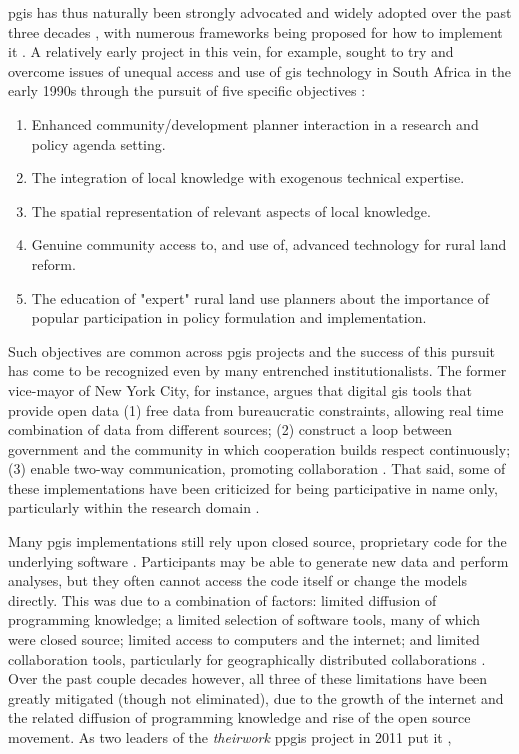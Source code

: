 \ac{pgis} has thus naturally been strongly advocated and widely adopted over the past three decades \cite{drummondFutureGISPlanning2008}, with numerous frameworks being proposed for how to implement it \cite{brommelstroetPlanningSupportSystems2010}. A relatively early project in this vein, for example, sought to try and overcome issues of unequal access and use of \ac{gis} technology in South Africa in the early 1990s through the pursuit of five specific objectives \cite{harrisPursuingSocialGoals1994}: 

\begin{enumerate}[itemsep=0pt,parsep=0pt]
	\item{Enhanced community/development planner interaction in a research and policy agenda setting.}
	\item{The integration of local knowledge with exogenous technical expertise.}
	\item{The spatial representation of relevant aspects of local knowledge.}
	\item{Genuine community access to, and use of, advanced technology for rural land reform.}
	\item{The education of "expert" rural land use planners about the importance of popular participation in policy formulation and implementation.}
\end{enumerate}

Such objectives are common across \ac{pgis} projects and the success of this pursuit has come to be recognized even by many entrenched institutionalists. The former vice-mayor of New York City, for instance, argues that digital \ac{gis} tools that provide open data (1) free data from bureaucratic constraints, allowing real time combination of data from different sources; (2) construct a loop between government and the community in which cooperation builds respect continuously; (3) enable two-way communication, promoting collaboration \cite{goldsmithResponsiveCityEngaging2014}. That said, some of these implementations have been criticized for being participative in name only, particularly within the research domain \cite{tebrommelstroetRelevanceResearchPlanning2009}.


Many \ac{pgis} implementations still rely upon closed source, proprietary code for the underlying software \cite{heikkilaGISDeadLong1998}. Participants may be able to generate new data and perform analyses, but they often cannot access the code itself or change the models directly. This was due to a combination of factors: limited diffusion of programming knowledge; a limited selection of software tools, many of which were closed source; limited access to computers and the internet; and limited collaboration tools, particularly for geographically distributed collaborations \cite{cramptonIntroductionCriticalCartography2005}. Over the past couple decades however, all three of these limitations have been greatly mitigated (though not eliminated), due to the growth of the internet and the related diffusion of programming knowledge and rise of the open source movement. As two leaders of the \textit{theirwork} \ac{ppgis} project in 2011 put it \cite{williamsonTheirworkDevelopmentSustainable2011}, 

